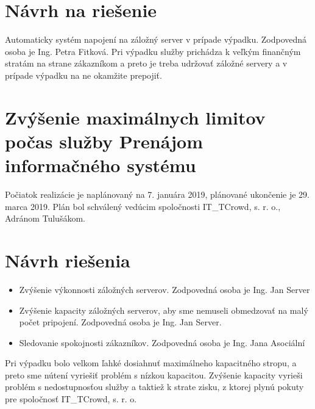 \documentclass[a4paper, 11pt]{article}
\begin{document}
\section*{Návrh na riešenie}
Automaticky systém napojení na záložný server v prípade výpadku. Zodpovedná osoba je Ing. Petra Fitková. Pri výpadku služby prichádza k veľkým finančným stratám na strane zákazníkom a preto je treba udržovať záložné servery a v prípade výpadku na ne okamžite prepojiť.

\section*{Zvýšenie maximálnych limitov počas služby Prenájom informačného systému}
Počiatok realizácie je naplánovaný na 7. januára 2019, plánované ukončenie je 29. marca 2019. Plán bol schválený vedúcim spoločnosti IT\_TCrowd, s. r. o., Adránom Tulušákom.

\section*{Návrh riešenia}
\begin{itemize}
\item Zvýšenie výkonnosti záložných serverov. Zodpovedná osoba je Ing. Jan Server
\item Zvýšenie kapacity záložných serverov, aby sme nemuseli obmedzovať na malý počet pripojení. Zodpovedná osoba je Ing. Jan Server.
\item Sledovanie spokojnosti zákazníkov. Zodpovedná osoba je Ing. Jana Asociální
\end{itemize}

Pri výpadku bolo velkom ľahké dosiahnuť maximálneho kapacitného stropu, a preto sme nútení vyriešiť problém s nízkou kapacitou. Zvýšenie kapacity vyrieši problém s nedostupnosťou služby a taktiež k strate zisku, z ktorej plynú pokuty pre spoločnosť IT\_TCrowd, s. r. o.
\end{document}
